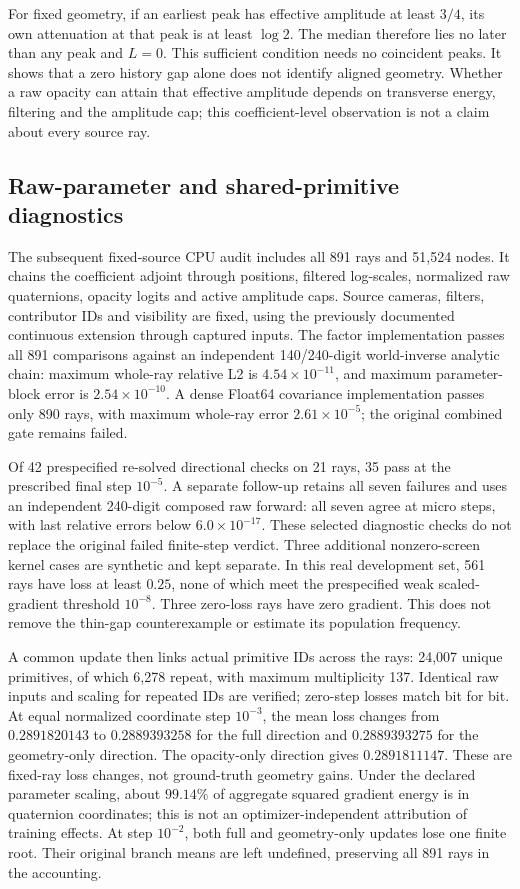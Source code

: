 \documentclass[11pt,a4paper]{article}
\begin{document}
For fixed geometry, if an earliest peak has effective amplitude at least
$3/4$, its own attenuation at that peak is at least $\log2$.
The median therefore lies no later than any peak and $L=0$.
This sufficient condition needs no coincident peaks. It shows that a
zero history gap alone does not identify aligned geometry. Whether a
raw opacity can attain that effective amplitude depends on transverse
energy, filtering and the amplitude cap; this coefficient-level
observation is not a claim about every source ray.

\subsection{Raw-parameter and shared-primitive diagnostics}
The subsequent fixed-source CPU audit includes all 891 rays and 51,524
nodes. It chains the coefficient adjoint through positions, filtered
log-scales, normalized raw quaternions, opacity logits and active
amplitude caps. Source cameras, filters, contributor IDs and visibility
are fixed, using the previously documented continuous extension through
captured inputs. The factor implementation passes all 891 comparisons
against an independent 140/240-digit world-inverse analytic chain:
maximum whole-ray relative L2 is $4.54\times10^{-11}$, and maximum
parameter-block error is $2.54\times10^{-10}$. A dense Float64 covariance
implementation passes only 890 rays, with maximum whole-ray error
$2.61\times10^{-5}$; the original combined gate remains failed.

Of 42 prespecified re-solved directional checks on 21 rays, 35 pass at
the prescribed final step $10^{-5}$. A separate follow-up retains all
seven failures and uses an independent 240-digit composed raw forward:
all seven agree at micro steps, with last relative errors below
$6.0\times10^{-17}$. These selected diagnostic checks do not replace
the original failed finite-step verdict. Three additional nonzero-screen
kernel cases are synthetic and kept separate. In this real development
set, 561 rays have loss at least $0.25$, none of which meet the
prespecified weak scaled-gradient threshold $10^{-8}$. Three zero-loss
rays have zero gradient. This does not remove the thin-gap counterexample
or estimate its population frequency.

A common update then links actual primitive IDs across the rays:
24,007 unique primitives, of which 6,278 repeat, with maximum
multiplicity 137. Identical raw inputs and scaling for repeated IDs are
verified; zero-step losses match bit for bit. At equal normalized
coordinate step $10^{-3}$, the mean loss changes from $0.2891820143$
to $0.2889393258$ for the full direction and $0.2889393275$ for the
geometry-only direction. The opacity-only direction gives
$0.2891811147$. These are fixed-ray loss changes, not ground-truth
geometry gains. Under the declared parameter scaling, about $99.14\%$
of aggregate squared gradient energy is in quaternion coordinates;
this is not an optimizer-independent attribution of training effects.
At step $10^{-2}$, both full and geometry-only updates lose one finite
root. Their original branch means are left undefined, preserving all
891 rays in the accounting.
\end{document}
